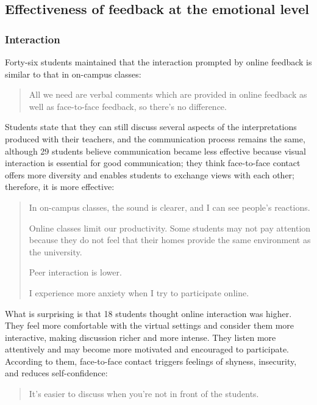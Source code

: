 \documentclass[english]{textolivre}
\begin{document}
\subsection{Effectiveness of feedback at the emotional level}

\subsubsection{Interaction}
Forty-six students maintained that the interaction prompted by online feedback is similar to that in on-campus classes:

\begin{quote}
All we need are verbal comments which are provided in online feedback as well as face-to-face feedback, so there’s no difference.  
\end{quote}

Students state that they can still discuss several aspects of the interpretations produced with their teachers, and the communication process remains the same, although 29 students believe communication became less effective because visual interaction is essential for good communication; they think face-to-face contact offers more diversity and enables students to exchange views with each other; therefore, it is more effective:

\begin{quote}
    In on-campus classes, the sound is clearer, and I can see people's reactions.
    
Online classes limit our productivity. Some students may not pay attention because they do not feel that their homes provide the same environment as the university.

Peer interaction is lower.

I experience more anxiety when I try to participate online.
\end{quote}

What is surprising is that 18 students thought online interaction was higher. They feel more comfortable with the virtual settings and consider them more interactive, making discussion richer and more intense. They listen more attentively and may become more motivated and encouraged to participate. According to them, face-to-face contact triggers feelings of shyness, insecurity, and reduces self-confidence:

\begin{quote}
    It's easier to discuss when you're not in front of the students.
\end{quote}
\end{document}
